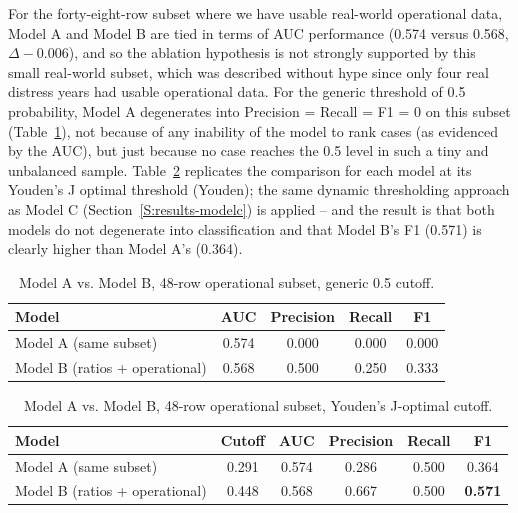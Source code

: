 \documentclass[final,1p,times]{elsarticle}
\begin{document}
For the forty-eight-row subset where we have usable real-world operational data, Model A and Model B are tied in terms of AUC performance (0.574 versus 0.568, $\Delta -0.006$), and so the ablation hypothesis is not strongly supported by this small real-world subset, which was described without hype since only four real distress years had usable operational data. For the generic threshold of 0.5 probability, Model A degenerates into Precision = Recall = F1 = 0 on this subset (Table~\ref{tab:ablation-05}), not because of any inability of the model to rank cases (as evidenced by the AUC), but just because no case reaches the 0.5 level in such a tiny and unbalanced sample. Table~\ref{tab:ablation-opt} replicates the comparison for each model at its Youden's J optimal threshold (Youden); the same dynamic thresholding approach as Model C (Section~\ref{S:results-modelc}) is applied -- and the result is that both models do not degenerate into classification and that Model B's F1 (0.571) is clearly higher than Model A's (0.364).

\begin{table}[h]
\centering
\small
\caption{Model A vs. Model B, 48-row operational subset, generic 0.5 cutoff.}
\label{tab:ablation-05}
\begin{tabular}{lcccc}
\toprule
\textbf{Model} & \textbf{AUC} & \textbf{Precision} & \textbf{Recall} & \textbf{F1} \\
\midrule
Model A (same subset) & 0.574 & 0.000 & 0.000 & 0.000 \\
Model B (ratios + operational) & 0.568 & 0.500 & 0.250 & 0.333 \\
\bottomrule
\end{tabular}
\end{table}

\begin{table}[h]
\centering
\small
\caption{Model A vs. Model B, 48-row operational subset, Youden's J-optimal cutoff.}
\label{tab:ablation-opt}
\begin{tabular}{lccccc}
\toprule
\textbf{Model} & \textbf{Cutoff} & \textbf{AUC} & \textbf{Precision} & \textbf{Recall} & \textbf{F1} \\
\midrule
Model A (same subset) & 0.291 & 0.574 & 0.286 & 0.500 & 0.364 \\
Model B (ratios + operational) & 0.448 & 0.568 & 0.667 & 0.500 & \textbf{0.571} \\
\bottomrule
\end{tabular}
\end{table}
\end{document}
